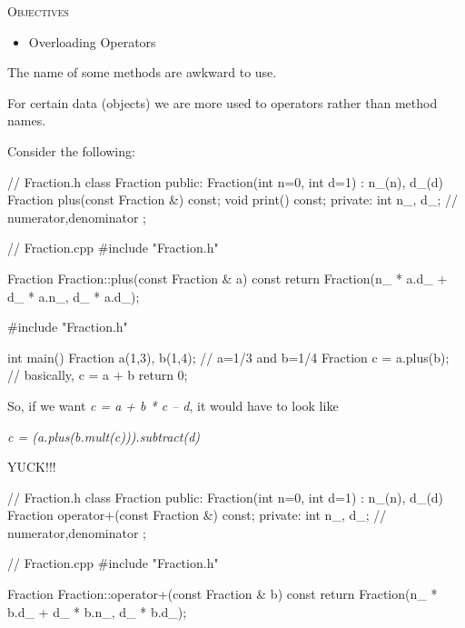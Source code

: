 \newpage{}

\textsc{Objectives}
\begin{itemize}
\item Overloading Operators
\end{itemize}


\newpage{}

The name of some methods are awkward to use.

For certain data (objects) we are more used to operators rather than
method names.

Consider the following:

\begin{consolethree}[escapeinside=||]
// Fraction.h
class Fraction
{
public:
    Fraction(int n=0, int d=1)
        : n_(n), d_(d)
    {}
    Fraction plus(const Fraction &) const;
    void print() const;
private:
    int n_, d_; // numerator,denominator
};
\end{consolethree}

\begin{consolethree}[escapeinside=||]
// Fraction.cpp
#include "Fraction.h"

Fraction Fraction::plus(const Fraction & a) const
{
    return Fraction(n_ * a.d_ + d_ * a.n_, d_ * a.d_);
}
\end{consolethree}

\begin{consolethree}[escapeinside=||]
#include "Fraction.h"

int main()
{
    Fraction a(1,3), b(1,4); // a=1/3 and b=1/4
    Fraction c = a.plus(b); // basically, c = a + b
    return 0;
}
\end{consolethree}

So, if we want \textit{c = a + b * c -- d}, it would have to look like

\textit{c = (a.plus(b.mult(c))).subtract(d)}

YUCK!!!


\newpage{}

\begin{consolethree}[escapeinside=||]
// Fraction.h
class Fraction
{
public:
    Fraction(int n=0, int d=1)
        : n_(n), d_(d)
    {}
    Fraction operator+(const Fraction &) const;
private:
    int n_, d_; // numerator,denominator
};
\end{consolethree}

\begin{consolethree}[escapeinside=||]
// Fraction.cpp
#include "Fraction.h"

Fraction Fraction::operator+(const Fraction & b) const
{
    return Fraction(n_ * b.d_ + d_ * b.n_, d_ * b.d_);
}
\end{consolethree}

